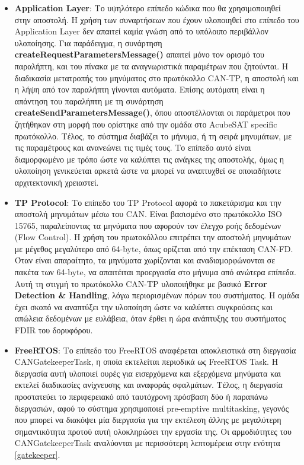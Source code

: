 \documentclass[a4paper,nobib,justified]{tufte-book}
\begin{document}
\begin{itemize}
	\item \textbf{Application Layer}: Το υψηλότερο επίπεδο κώδικα που θα χρησιμοποιηθεί στην αποστολή. Η χρήση των συναρτήσεων που έχουν υλοποιηθεί στο επίπεδο του Application Layer δεν απαιτεί καμία γνώση από το υπόλοιπο περιβάλλον υλοποίησης. Για παράδειγμα, η συνάρτηση \textbf{createRequestParametersMessage()} απαιτεί μόνο τον ορισμό του παραλήπτη, και του πίνακα με τα αναγνωριστικά παραμέτρων που ζητούνται. Η διαδικασία μετατροπής του μηνύματος στο πρωτόκολλο CAN-TP, η αποστολή και η λήψη από τον παραλήπτη γίνονται αυτόματα. Επίσης αυτόματη είναι η απάντηση του παραλήπτη με τη συνάρτηση \textbf{createSendParametersMessage()}, όπου αποστέλλονται οι παράμετροι που ζητήθηκαν στη μορφή που ορίστηκε από την ομάδα στο AcubeSAT specific πρωτόκολλο. Τέλος, το σύστημα διαβάζει το μήνυμα, ή τη σειρά μηνυμάτων, με τις παραμέτρους και ανανεώνει τις τιμές τους. Το επίπεδο αυτό είναι διαμορφωμένο με τρόπο ώστε να καλύπτει τις ανάγκες της αποστολής, όμως η υλοποίηση γενικεύεται αρκετά ώστε να μπορεί να αναπτυχθεί σε οποιαδήποτε αρχιτεκτονική χρειαστεί.
	\item \textbf{TP Protocol}: Το επίπεδο του TP Protocol αφορά το πακετάρισμα και την αποστολή μηνυμάτων μέσω του CAN. Είναι βασισμένο στο πρωτόκολλο ISO 15765, παραλείποντας τα μηνύματα που αφορούν τον έλεγχο ροής δεδομένων (Flow Control). Η χρήση του πρωτοκόλλου επιτρέπει την αποστολή μηνυμάτων με μέγεθος μεγαλύτερο από 64-byte, όπως ορίζεται από την επέκταση CAN-FD. Όταν είναι απαραίτητο, τα μηνύματα χωρίζονται και αναδιαμορφώνονται σε πακέτα των 64-byte, να απαιτέιται προεργασία στο μήνυμα από ανώτερα επίπεδα. Αυτή τη στιγμή το πρωτόκολλο CAN-TP υλοποιήθηκε με βασικό \textbf{Error Detection \& Handling}, λόγω περιορισμένων πόρων του συστήματος. Η ομάδα έχει σκοπό να αναπτύξει την υλοποίηση ώστε να καλύπτει συγκρούσεις και απώλεια δεδομένων με ευλάβεια, όταν έρθει η ώρα ανάπτυξης του συστήματος FDIR του δορυφόρου.
	\item \textbf{FreeRTOS}: Το επίπεδο του FreeRTOS αναφέρεται αποκλειστικά στη διεργασία CANGatekeeperTask, η οποία εκτελείται περιοδικά ως FreeRTOS Task. Η διεργασία αυτή υλοποιεί ουρές για εισερχόμενα και εξερχόμενα μηνύματα και εκτελεί διαδικασίες ανίχνευσης και αναφοράς σφαλμάτων. Τέλος, η διεργασία προστατεύει το περιφερειακό από ταυτόχρονη πρόσβαση δύο ή παραπάνω διεργασιών, αφού το σύστημα χρησιμοποιεί pre-emptive multitasking, γεγονός που μπορεί να διακόψει μία διεργασία για την εκτέλεση άλλης με μεγαλύτερη σημαντικότητα προτού αυτή ολοκληρώσει την εργασία της. Οι αρμοδιότητες του CANGatekeeperTask αναλύονται με περισσότερη λεπτομέρεια στην ενότητα \ref{gatekeeper}.

\end{itemize}
\end{document}
